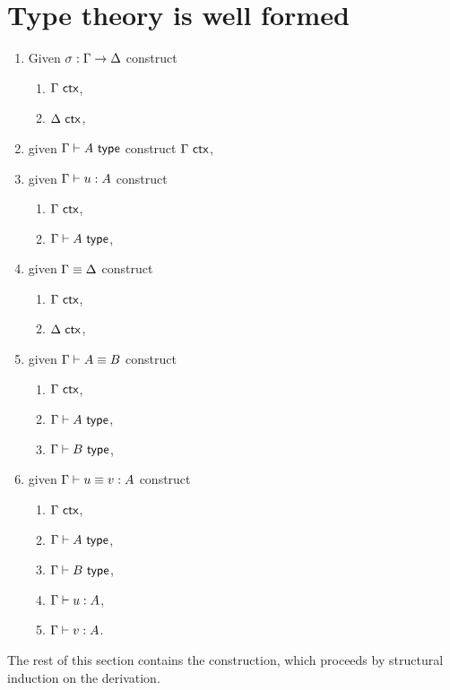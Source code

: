 \section{Type theory is well formed}
\label{sec:type-theory-well}

\begin{problem}
  \leavevmode
  \begin{enumerate}
  \item \label{sane-issubst} Given $\sigma : \Gamma \to \Delta$ construct
    \begin{enumerate}
    \item $\Gamma\ \mathsf{ctx}$,
    \item $\Delta\ \mathsf{ctx}$,
    \end{enumerate}
  \item \label{sane-istype}  given $\Gamma \vdash A \ \mathsf{type}$ construct $\Gamma\ \mathsf{ctx}$,
  \item \label{sane-isterm}  given $\Gamma \vdash u : A$ construct
    \begin{enumerate}
    \item $\Gamma\ \mathsf{ctx}$,
    \item $\Gamma \vdash A \ \mathsf{type}$,
    \end{enumerate}
  \item \label{sane-eqctx}   given $\Gamma \equiv \Delta$ construct
    \begin{enumerate}
    \item $\Gamma\ \mathsf{ctx}$,
    \item $\Delta\ \mathsf{ctx}$,
    \end{enumerate}
  \item \label{sane-eqtype}  given $\Gamma \vdash A \equiv B$ construct
    \begin{enumerate}
    \item $\Gamma\ \mathsf{ctx}$,
    \item $\Gamma \vdash A \ \mathsf{type}$,
    \item $\Gamma \vdash B \ \mathsf{type}$,
    \end{enumerate}
  \item \label{sane-eqterm}  given $\Gamma \vdash u \equiv v : A$ construct
    \begin{enumerate}
    \item $\Gamma\ \mathsf{ctx}$,
    \item $\Gamma \vdash A \ \mathsf{type}$,
    \item $\Gamma \vdash B \ \mathsf{type}$,
    \item $\Gamma \vdash u : A$,
    \item $\Gamma \vdash v : A$.
    \end{enumerate}
  \end{enumerate}
\end{problem}
%
The rest of this section contains the construction, which proceeds by structural induction on the
derivation.


